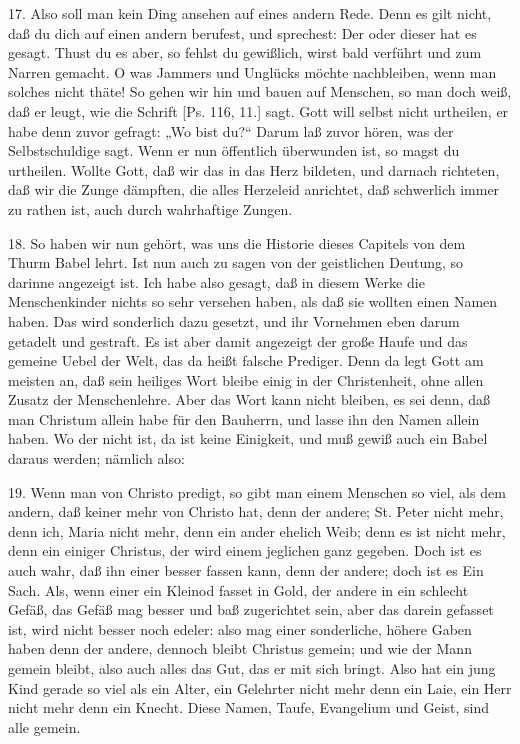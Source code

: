 17. Also soll man kein Ding ansehen auf eines andern Rede. Denn es gilt nicht, daß du dich auf einen andern berufest, und sprechest: Der oder dieser hat es gesagt. Thust du es aber, so fehlst du gewißlich, wirst bald verführt und zum Narren gemacht. O was Jammers und Unglücks möchte nachbleiben, wenn man solches nicht thäte! So gehen wir hin und bauen auf Menschen, so man doch weiß, daß er leugt, wie die Schrift [Ps. 116, 11.] sagt. Gott will selbst nicht urtheilen, er habe denn zuvor gefragt: „Wo bist du?“ Darum laß zuvor hören, was der Selbstschuldige sagt. Wenn er nun öffentlich überwunden ist, so magst du urtheilen. Wollte Gott, daß wir das in das Herz bildeten, und darnach richteten, daß wir die Zunge dämpften, die alles Herzeleid anrichtet, daß schwerlich immer zu rathen ist, auch durch wahrhaftige Zungen.

18. So haben wir nun gehört, was uns die Historie dieses Capitels von dem Thurm Babel lehrt. Ist nun auch zu sagen von der geistlichen Deutung, so darinne angezeigt ist. Ich habe also gesagt, daß in diesem Werke die Menschenkinder nichts so sehr versehen haben, als daß sie wollten einen Namen haben. Das wird sonderlich dazu gesetzt, und ihr Vornehmen eben darum getadelt und gestraft. Es ist aber damit angezeigt der große Haufe und das gemeine Uebel der Welt, das da heißt falsche Prediger. Denn da legt Gott am meisten an, daß sein heiliges Wort bleibe einig in der Christenheit, ohne allen Zusatz der Menschenlehre. Aber das Wort kann nicht bleiben, es sei denn, daß man Christum allein habe für den Bauherrn, und lasse ihn den Namen allein haben. Wo der nicht ist, da ist keine Einigkeit, und muß gewiß auch ein Babel daraus werden; nämlich also:

19. Wenn man von Christo predigt, so gibt man einem Menschen so viel, als dem andern, daß keiner mehr von Christo hat, denn der andere; St. Peter nicht mehr, denn ich, Maria nicht mehr, denn ein ander ehelich Weib; denn es ist nicht mehr, denn ein einiger Christus, der wird einem jeglichen ganz gegeben. Doch ist es auch wahr, daß ihn einer besser fassen kann, denn der andere; doch ist es Ein Sach. Als, wenn einer ein Kleinod fasset in Gold, der andere in ein schlecht Gefäß, das Gefäß mag besser und baß zugerichtet sein, aber das darein gefasset ist, wird nicht besser noch edeler: also mag einer sonderliche, höhere Gaben haben denn der andere, dennoch bleibt Christus gemein; und wie der Mann gemein bleibt, also auch alles das Gut, das er mit sich bringt. Also hat ein jung Kind gerade so viel als ein Alter, ein Gelehrter nicht mehr denn ein Laie, ein Herr nicht mehr denn ein Knecht. Diese Namen, Taufe, Evangelium und Geist, sind alle gemein.

